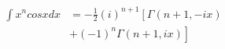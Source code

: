 






\[\begin{align} \int x^n cos x dx &= -\frac{1}{2}(i)^{n+1}\left [ \Gamma(n+1, -ix) \right . \nonumber \\\ & \left . + (-1)^n \Gamma(n+1, ix)\right] \end{align}\]

